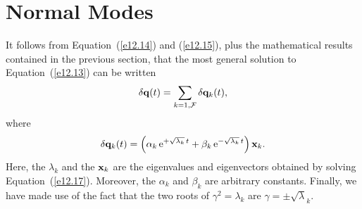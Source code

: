 \section{Normal Modes} 
It follows from Equation~(\ref{e12.14}) and (\ref{e12.15}), plus the
mathematical results contained in the previous section, that the
most general solution to Equation~(\ref{e12.13}) can be written
\begin{equation}\label{e12.31}
\delta {\bf q}(t) = \sum_{k=1,{\cal F}}\delta {\bf q}_k(t),
\end{equation}
where
\begin{equation}\label{e12.32}
\delta {\bf q}_k(t) = \left(\alpha_k \,{\rm e}^{+\sqrt{\lambda_k}\,t}+\beta_k\,{\rm e}^{-\sqrt{\lambda_k}\,t}\right)
{\bf x}_k. 
\end{equation}
Here, the $\lambda_k$ and the ${\bf x}_k$ are the eigenvalues and eigenvectors obtained by solving Equation~(\ref{e12.17}). Moreover, the $\alpha_k$ and $\beta_k$ are arbitrary constants. Finally, we have made
use of the fact that the two roots of $\gamma^2=\lambda_k$ are
$\gamma=\pm \sqrt{\lambda}_k$. 


